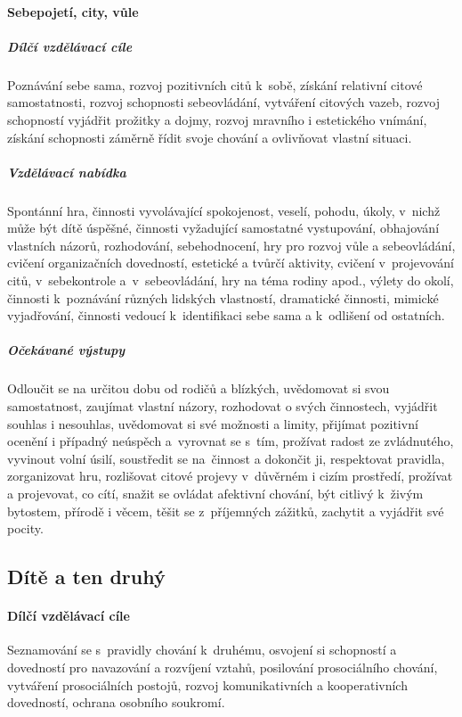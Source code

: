 				\paragraph{Sebepojetí, city, vůle}

					\subparagraph{Dílčí vzdělávací cíle}
						Poznávání sebe sama, rozvoj pozitivních citů k sobě, získání relativní citové samostatnosti, rozvoj schopnosti sebeovládání, vytváření citových vazeb, rozvoj schopností vyjádřit prožitky a dojmy, rozvoj mravního i estetického vnímání, získání schopnosti záměrně řídit svoje chování a ovlivňovat vlastní situaci.
					\subparagraph{Vzdělávací nabídka}
						Spontánní hra, činnosti vyvolávající spokojenost, veselí, pohodu, úkoly, v nichž může být dítě úspěšné, činnosti vyžadující samostatné vystupování, obhajování vlastních názorů, rozhodování, sebehodnocení, hry pro rozvoj vůle a sebeovládání, cvičení organizačních dovedností, estetické a tvůrčí aktivity, cvičení v projevování citů, v sebekontrole a v sebeovládání, hry na téma rodiny apod., výlety do okolí, činnosti k poznávání různých lidských vlastností, dramatické činnosti, mimické vyjadřování, činnosti vedoucí k identifikaci sebe sama a k odlišení od ostatních.
					\subparagraph{Očekávané výstupy}
						Odloučit se na určitou dobu od rodičů a blízkých, uvědomovat si svou samostatnost, zaujímat vlastní názory, rozhodovat o svých činnostech, vyjádřit souhlas i nesouhlas, uvědomovat si své možnosti a limity, přijímat pozitivní ocenění i případný neúspěch a vyrovnat se s tím, prožívat radost ze zvládnutého, vyvinout volní úsilí, soustředit se na činnost a dokončit ji, respektovat pravidla, zorganizovat hru, rozlišovat citové projevy v důvěrném i cizím prostředí, prožívat a projevovat, co cítí, snažit se ovládat afektivní chování, být citlivý k živým bytostem, přírodě i věcem, těšit se z příjemných zážitků, zachytit a vyjádřit své pocity.

			\subsection{Dítě a ten druhý}
				\textit{} \citep[s.~24]{RVP}
					\paragraph{Dílčí vzdělávací cíle}
						Seznamování se s pravidly chování k druhému, osvojení si schopností a dovedností pro navazování a rozvíjení vztahů, posilování prosociálního chování, vytváření prosociálních postojů, rozvoj komunikativních a kooperativních dovedností, ochrana osobního soukromí.
